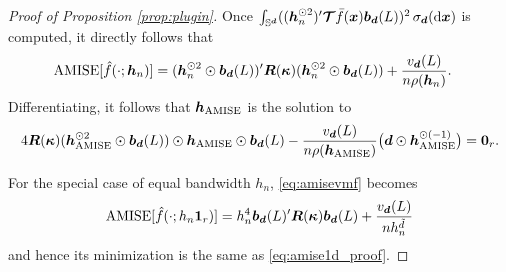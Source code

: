 \documentclass[oneside,11pt]{article}
\begin{document}
\begin{proof}[Proof of Proposition \ref{prop:plugin}]
Once $\int_{\mathbb{S}^{\boldsymbol{d}}}(({\boldsymbol{h}}_n^{\odot 2})'\boldsymbol{\mathcal{T}}\bar{f}(\boldsymbol{x})\boldsymbol{b}_{\boldsymbol{d}}(L))^2\,\sigma_{\boldsymbol{d}}(\mathrm{d}\boldsymbol{x})$ is computed, it directly follows that
\begin{align}
    \mathrm{AMISE}[\hat{f}(\cdot;{\boldsymbol{h}}_n)]=&\;({\boldsymbol{h}}_n^{\odot 2}\odot\boldsymbol{b}_{\boldsymbol{d}}(L))'\boldsymbol{R}(\boldsymbol\kappa)({\boldsymbol{h}}_n^{\odot 2}\odot\boldsymbol{b}_{\boldsymbol{d}}(L))+\frac{v_{\boldsymbol{d}}(L)}{n\rho({\boldsymbol{h}}_n)}.\label{eq:amisevmf}
\end{align}
Differentiating, it follows that ${\boldsymbol{h}}_{\mathrm{AMISE}}$ is the solution to
\begin{align*}
    4 \boldsymbol{R}(\boldsymbol\kappa)({{\boldsymbol{h}}}_{\mathrm{AMISE}}^{\odot 2}\odot\boldsymbol{b}_{\boldsymbol{d}}(L))\odot {{\boldsymbol{h}}}_{\mathrm{AMISE}}\odot\boldsymbol{b}_{\boldsymbol{d}}(L)-\frac{v_{\boldsymbol{d}}(L)}{n\rho({\boldsymbol{h}}_{\mathrm{AMISE}})}\big(\boldsymbol{d}\odot{{\boldsymbol{h}}}_{\mathrm{AMISE}}^{\odot(-1)}\big)=\mathbf{0}_r.
\end{align*}

For the special case of equal bandwidth $h_n$, \eqref{eq:amisevmf}
becomes
\begin{align*}
    \mathrm{AMISE}[\hat{f}(\cdot;h_n\mathbf{1}_r)]=h_n^4 \boldsymbol{b}_{\boldsymbol{d}}(L)'\boldsymbol{R}(\boldsymbol\kappa)\boldsymbol{b}_{\boldsymbol{d}}(L)+\frac{v_{\boldsymbol{d}}(L)}{nh_n^{\tilde{d}}}
\end{align*}
and hence its minimization is the same as \eqref{eq:amise1d_proof}.
\end{proof}
\end{document}
